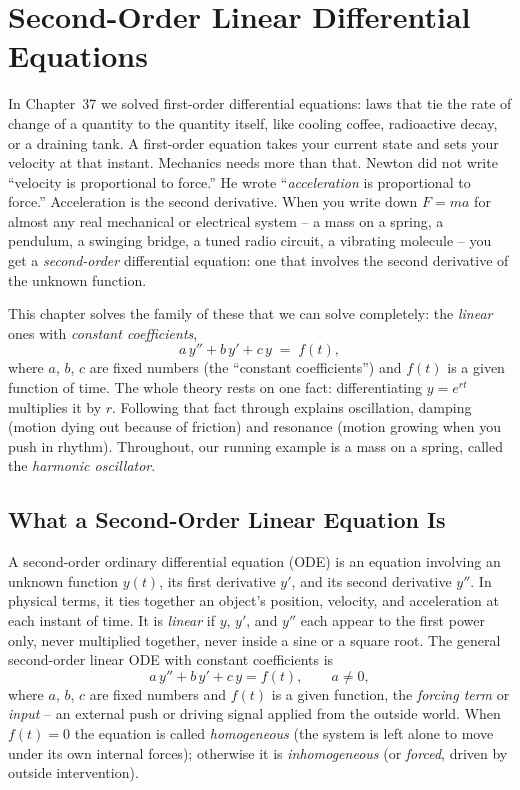 \chapter{Second-Order Linear Differential Equations}

In Chapter~37 we solved first-order differential equations: laws that tie
the rate of change of a quantity to the quantity itself, like cooling
coffee, radioactive decay, or a draining tank. A first-order equation takes your
current state and sets your velocity at that instant. Mechanics needs more than
that. Newton did
not write ``velocity is proportional to force.'' He wrote ``\emph{acceleration}
is proportional to force.'' Acceleration is the second derivative. When
you write down $F = ma$ for almost any real mechanical or electrical system -- a
mass on a spring, a pendulum, a swinging bridge, a tuned radio circuit, a
vibrating molecule -- you get a \emph{second-order} differential equation: one
that involves the second derivative of the unknown function.

This chapter solves the family of these that we can solve completely: the
\emph{linear} ones with \emph{constant coefficients},
\[
  a\,y'' + b\,y' + c\,y \;=\; f(t),
\]
where $a$, $b$, $c$ are fixed numbers (the ``constant coefficients'') and $f(t)$
is a given function of time. The whole theory rests on one fact: differentiating
$y = e^{rt}$ multiplies it by $r$. Following that fact through explains
oscillation, damping (motion dying out because of friction) and resonance
(motion growing when you push in rhythm).
Throughout, our running example is a mass on a spring, called the \emph{harmonic
oscillator}.

\chapterline

\section{What a Second-Order Linear Equation Is}
\label{ch38:what}

A second-order ordinary differential equation (ODE) is an equation involving an
unknown function $y(t)$, its first derivative $y'$, and its second derivative
$y''$. In physical terms, it ties together an object's position, velocity, and
acceleration at each instant of time. It is \emph{linear} if $y$, $y'$, and
$y''$ each appear to the first power only, never multiplied together, never
inside a sine or a square root. The general second-order linear ODE with constant
coefficients is
\begin{equation}
  a\,y'' + b\,y' + c\,y = f(t),
  \qquad a \neq 0,
  \label{ch38:general}
\end{equation}
where $a$, $b$, $c$ are fixed numbers and $f(t)$ is a given function, the
\emph{forcing term} or \emph{input} -- an external push or driving signal
applied from the outside world. When $f(t) = 0$ the equation is called
\emph{homogeneous} (the system is left alone to move under its own internal
forces); otherwise it is \emph{inhomogeneous} (or \emph{forced}, driven by
outside intervention).

